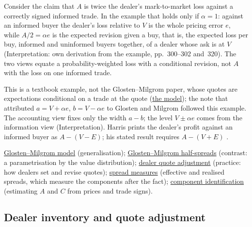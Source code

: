 \begin{qfresult}
 Consider the claim that $A$ is twice the dealer's mark-to-market loss against a correctly signed informed trade. In the example that holds only if $\alpha=1$: against an informed buyer the dealer's loss relative to $V$ is the whole pricing error $e$, while $A/2=\alpha e$ is the expected revision given a buy, that is, the expected loss per buy, informed and uninformed buyers together, of a dealer whose ask is at $V$ (Interpretation: own derivation from the example, pp.~300--302 and~320). The two views equate a probability-weighted loss with a conditional revision, not $A$ with the loss on one informed trade.

This is a textbook example, not the Glosten--Milgrom paper, whose quotes are expectations conditional on a trade at the quote (\hyperref[mod:glosten-milgrom]{the model}); the note that attributed $a=V+\alpha e$, $b=V-\alpha e$ to Glosten and Milgrom followed this example. The accounting view fixes only the width $a-b$; the level $V\pm\alpha e$ comes from the information view (Interpretation). Harris prints the dealer's profit against an informed buyer as $A-(V-E)$; his stated result requires $A-(V+E)$ \citep[chap.~``Bid/Ask Spreads'', p.~321]{alpha-harris}.

 \hyperref[mod:glosten-milgrom]{Glosten--Milgrom model} (generalisation); \hyperref[res:glosten-milgrom-half-spreads]{Glosten--Milgrom half-spreads} (contrast: a parametrisation by the value distribution); \hyperref[meth:dealer-quote-adjustment]{dealer quote adjustment} (practice: how dealers set and revise quotes); \hyperref[def:spread-measures]{spread measures} (effective and realised spreads, which measure the components after the fact); \hyperref[res:spread-component-identification]{component identification} (estimating $A$ and $C$ from prices and trade signs).

\end{qfresult}

\subsection{Dealer inventory and quote adjustment}

